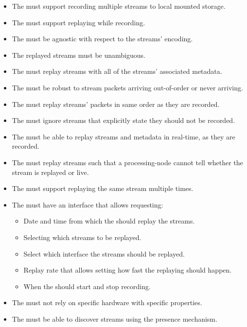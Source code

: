 \begin{itemize}
	\item The  must support recording multiple streams to local mounted storage.
	\item The  must support replaying while recording.
	\item The  must be agnostic with respect to the streams' encoding.
	\item The replayed streams must be unambiguous.
	\item The  must replay streams with all of the streams' associated metadata.
	\item The  must be robust to stream packets arriving out-of-order or never arriving.
	\item The  must replay streams' packets in same order as they are recorded.
	\item The  must ignore streams that explicitly state they should not be recorded.
	\item The  must be able to replay streams and metadata in real-time, as they are recorded.
	\item The  must replay streams such that a processing-node cannot tell whether the stream is replayed or live.
	\item The  must support replaying the same stream multiple times.
	
	\item The  must have an interface that allows requesting:
	\begin{itemize}
		\item Date and time from which the  should replay the streams.
		\item Selecting which streams to be replayed.
		\item Select which interface the streams should be replayed. 
		\item Replay rate that allows setting how fast the replaying should happen. 
		\item When the  should start and stop recording.
	\end{itemize}
	\item The  must not rely on specific hardware with specific properties.
	\item The  must be able to discover streams using the presence mechanism.
\end{itemize}

